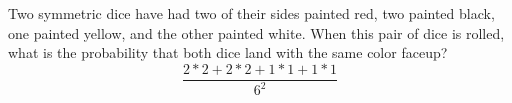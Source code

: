 \item Two symmetric dice have had two of their sides painted red, two painted black, one painted yellow, and the other painted white. When this pair of dice is rolled, what is the probability that both dice land with the same color faceup?
\[ \frac{2 * 2 + 2 * 2 + 1 * 1 + 1 * 1}{6^2} \]